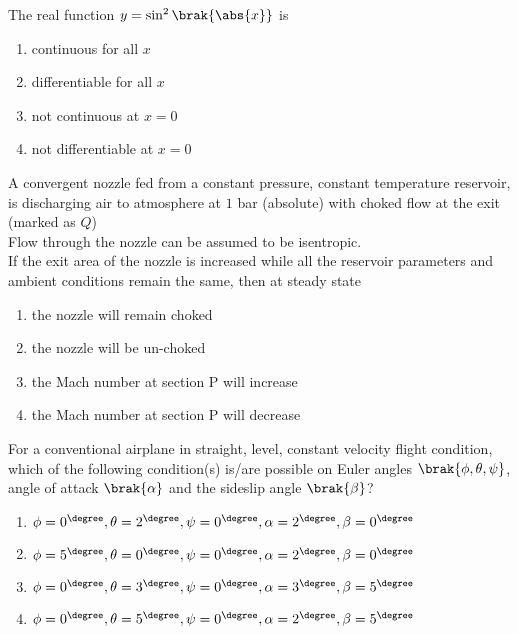    \item The real function $y = \sin ^2 \brak{\abs{x}}$ is
        \begin{enumerate}
            \item continuous for all $x$
            \item differentiable for all $x$
            \item not continuous at $x=0$
            \item not differentiable at $x=0$
        \end{enumerate}

    \item A convergent nozzle fed from a constant pressure, constant temperature reservoir, is discharging air to atmosphere at $1$ bar (absolute) with choked flow at the exit (marked as $Q$)\\Flow through the nozzle can be assumed to be isentropic.\\If the exit area of the nozzle is increased while all the reservoir parameters and ambient conditions remain the same, then at steady state
        \begin{figure}[H]
            \centering
            
            \caption{}
            \label{44fig}
        \end{figure}

        \begin{enumerate}
            \item the nozzle will remain choked
            \item the nozzle will be un-choked
            \item the Mach number at section P will increase
            \item the Mach number at section P will decrease
        \end{enumerate}

    \item For a conventional airplane in straight, level, constant velocity flight condition, which of the following condition(s) is/are possible on Euler angles $\brak{\phi, \theta, \psi}$, angle of attack $\brak{\alpha}$ and the sideslip angle $\brak{\beta}$?
        \begin{enumerate}
            \item $\phi = 0^{\degree}, \theta = 2^{\degree}, \psi = 0^{\degree}, \alpha = 2^{\degree}, \beta = 0^{\degree}$
            \item $\phi = 5^{\degree}, \theta = 0^{\degree}, \psi = 0^{\degree}, \alpha = 2^{\degree}, \beta = 0^{\degree}$
            \item $\phi = 0^{\degree}, \theta = 3^{\degree}, \psi = 0^{\degree}, \alpha = 3^{\degree}, \beta = 5^{\degree}$
            \item $\phi = 0^{\degree}, \theta = 5^{\degree}, \psi = 0^{\degree}, \alpha = 2^{\degree}, \beta = 5^{\degree}$
        \end{enumerate}

